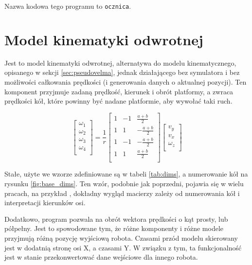 	Nazwa kodowa tego programu to \texttt{ocznica}.
	
\section{Model kinematyki odwrotnej}
	\label{sec:transmutator}
	Jest to model kinematyki odwrotnej, alternatywa do modelu kinematycznego, opisanego w sekcji \ref{sec:pseudovelma}, jednak działającego bez symulatora i bez możliwości 
	całkowania prędkości (i generowania danych o aktualnej pozycji).
	Ten komponent przyjmuje zadaną prędkość, kierunek i obrót platformy, a zwraca prędkości kół, które powinny być nadane platformie, aby wywołać taki ruch.
	
	\begin{equation}
	\begin{bmatrix}
	\omega_1 \\
	\omega_2 \\
	\omega_3 \\
	\omega_4 \\
	\end{bmatrix}
	=
	\frac{1}{r}
	\begin{bmatrix}
	1 & -1 & \frac{a+b}{2} \\
	1 & 1 & -\frac{a+b}{2} \\
	1 & -1 & -\frac{a+b}{2} \\
	1 & 1 & \frac{a+b}{2} \\
	\end{bmatrix}
	\begin{bmatrix}
	v_y \\
	v_x \\
	\omega_z \\
	\end{bmatrix}
	\end{equation}
	
	Stałe, użyte we wzorze zdefiniowane są w tabeli \ref{tab:dims}, a numerowanie kół na rysunku \ref{fig:base_dims}.
	Ten wzór, podobnie jak poprzedni, pojawia się w wielu pracach, na przykład \cite{wheels}, dokładny wygląd macierzy zależy od numerowania kół i interpretacji kierunków osi.
	
	Dodatkowo, program pozwala na obrót wektora prędkości o kąt prosty, lub półpełny. 
	Jest to spowodowane tym, że różne komponenty i różne modele przyjmują różną pozycję wyjściową robota.
	Czasami przód modelu skierowany jest w dodatnią stronę osi X, a czasami Y. W związku z tym, ta funkcjonalność jest w stanie przekonwertować dane wejściowe dla innego robota.
	
